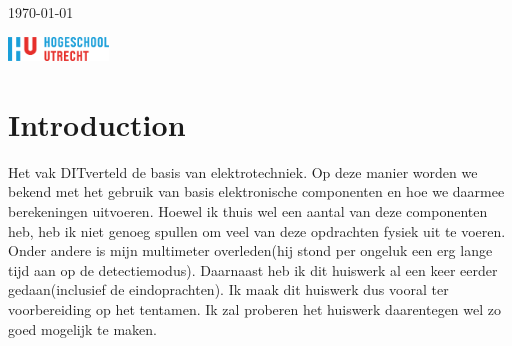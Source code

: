 \documentclass[fleqn]{article}
\newcommand\class{DIT}
\begin{document}
\begin{titlepage}
{	\vfill\vfill\vfill %
	
	{\large\monthyeardate\today}%
	
	
	\vfill
	\vfill
	 \includegraphics[width=0.2\textwidth]{../images/hu.png}
	
     }
\end{titlepage}

\chapter{Introduction}
Het vak \class verteld de basis van elektrotechniek. Op deze manier worden we bekend met het gebruik van basis
elektronische componenten en hoe we daarmee berekeningen uitvoeren.
Hoewel ik thuis wel een aantal van deze componenten heb, heb ik niet genoeg spullen om veel van deze opdrachten fysiek
uit te voeren. Onder andere is mijn multimeter overleden(hij stond per ongeluk een erg lange tijd aan op de
detectiemodus). 
Daarnaast heb ik dit huiswerk al een keer eerder gedaan(inclusief de eindoprachten). Ik maak dit huiswerk dus vooral ter
voorbereiding op het tentamen. Ik zal proberen het huiswerk daarentegen wel zo goed mogelijk te maken. 
\end{document}
